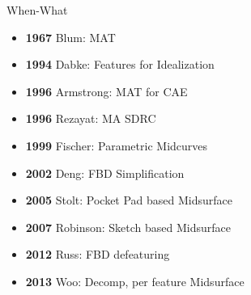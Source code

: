 \begin{frame}{When-What}
\begin{itemize}[noitemsep,label=\textbullet,topsep=2pt,parsep=2pt,partopsep=2pt]
\item \textbf{1967} Blum: MAT
\item \textbf{1994} Dabke: Features for Idealization
\item \textbf{1996} Armstrong: MAT for CAE
\item \textbf{1996} Rezayat: MA SDRC
\item \textbf{1999} Fischer: Parametric Midcurves
\item \textbf{2002} Deng: FBD Simplification
\item \textbf{2005} Stolt: Pocket Pad based Midsurface
\item \textbf{2007} Robinson: Sketch based Midsurface
\item \textbf{2012} Russ: FBD defeaturing
\item \textbf{2013} Woo: Decomp, per feature Midsurface
\end{itemize}


\end{frame}

%

